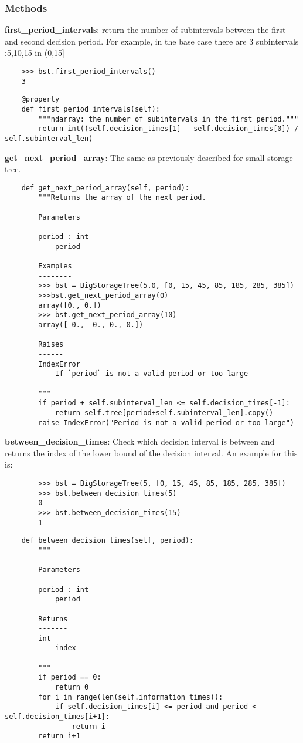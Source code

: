 \documentclass[12pt]{article}
\begin{document}
\subsubsection{Methods}
\textbf{first\_period\_intervals}: return the number of subintervals between the first and second decision period. For example, in the base case there are 3 subintervals :{5,10,15} in (0,15]
\begin{verbatim}
    >>> bst.first_period_intervals()
    3
\end{verbatim}
\begin{verbatim}
	@property
	def first_period_intervals(self):
		"""ndarray: the number of subintervals in the first period."""
		return int((self.decision_times[1] - self.decision_times[0]) / self.subinterval_len)
\end{verbatim}
\textbf{get\_next\_period\_array}: The same as previously described for small storage tree.
\begin{verbatim}
	def get_next_period_array(self, period):
		"""Returns the array of the next period.

		Parameters
		----------
		period : int
			period

		Examples
		--------
		>>> bst = BigStorageTree(5.0, [0, 15, 45, 85, 185, 285, 385])
		>>>bst.get_next_period_array(0)
		array([0., 0.])
		>>> bst.get_next_period_array(10)
		array([ 0.,  0., 0., 0.])

		Raises
		------
		IndexError
			If `period` is not a valid period or too large

		"""
		if period + self.subinterval_len <= self.decision_times[-1]:
			return self.tree[period+self.subinterval_len].copy()
		raise IndexError("Period is not a valid period or too large")
\end{verbatim}
\textbf{between\_decision\_times}: Check which decision interval is between and returns
		the index of the lower bound of the decision interval. An example for this is:
\begin{verbatim}
		>>> bst = BigStorageTree(5, [0, 15, 45, 85, 185, 285, 385])
		>>> bst.between_decision_times(5)
		0
		>>> bst.between_decision_times(15)
		1
\end{verbatim}
\begin{verbatim}
	def between_decision_times(self, period):
		"""

		Parameters
		----------
		period : int
			period

		Returns
		-------
		int
			index

		"""
		if period == 0:
			return 0
		for i in range(len(self.information_times)):
			if self.decision_times[i] <= period and period < self.decision_times[i+1]:
				return i
		return i+1
\end{verbatim}
\end{document}
